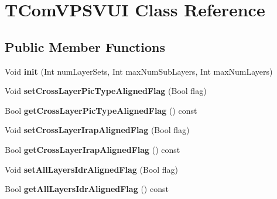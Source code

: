 \hypertarget{class_t_com_v_p_s_v_u_i}{}\section{T\+Com\+V\+P\+S\+V\+UI Class Reference}
\label{class_t_com_v_p_s_v_u_i}
\subsection*{Public Member Functions}
\begin{DoxyCompactItemize}
\item 
\mbox{\label{class_t_com_v_p_s_v_u_i_a90c186feb0ebe9010ec0c8f7d0dc296e}} 
Void {\bfseries init} (Int num\+Layer\+Sets, Int max\+Num\+Sub\+Layers, Int max\+Num\+Layers)
\item 
\mbox{\label{class_t_com_v_p_s_v_u_i_abc4b65289d2653b64f7cc5ce345b4b4d}} 
Void {\bfseries set\+Cross\+Layer\+Pic\+Type\+Aligned\+Flag} (Bool flag)
\item 
\mbox{\label{class_t_com_v_p_s_v_u_i_abbe673461a274849b5989014d0c96e41}} 
Bool {\bfseries get\+Cross\+Layer\+Pic\+Type\+Aligned\+Flag} () const
\item 
\mbox{\label{class_t_com_v_p_s_v_u_i_adc874238037a2423c4a6392725e62cd8}} 
Void {\bfseries set\+Cross\+Layer\+Irap\+Aligned\+Flag} (Bool flag)
\item 
\mbox{\label{class_t_com_v_p_s_v_u_i_adf224f3d0dab1cb62c7350dd87446a9f}} 
Bool {\bfseries get\+Cross\+Layer\+Irap\+Aligned\+Flag} () const
\item 
\mbox{\label{class_t_com_v_p_s_v_u_i_ae1ba007b3f745464bc9b7aa871deee89}} 
Void {\bfseries set\+All\+Layers\+Idr\+Aligned\+Flag} (Bool flag)
\item 
\mbox{\label{class_t_com_v_p_s_v_u_i_a8bbd91633959faa43c9b3775844caa32}} 
Bool {\bfseries get\+All\+Layers\+Idr\+Aligned\+Flag} () const
\item 
\mbox{\label{class_t_com_v_p_s_v_u_i_ac9c6ac617ef8307ed7b4fcb1f86b0cb1}} 

\end{DoxyCompactItemize}
